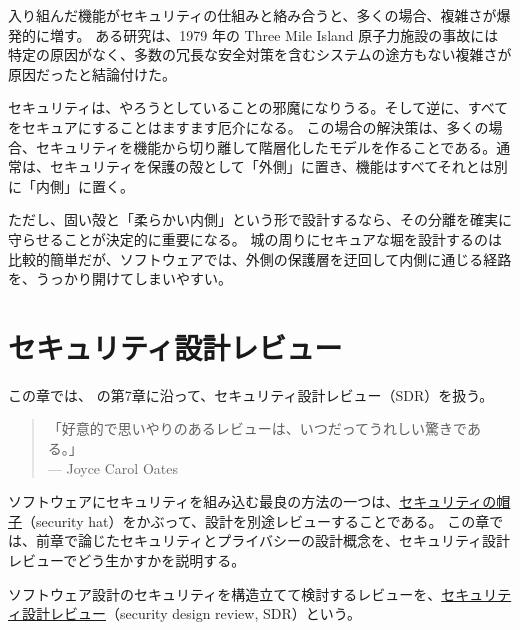 \documentclass[uplatex]{jsarticle}
\def\label#1{}%
\begin{document}
\begin{exa}\label{exa:ch6-three-mile-island}
入り組んだ機能がセキュリティの仕組みと絡み合うと、多くの場合、複雑さが爆発的に増す。
ある研究は、1979 年の Three Mile Island 原子力施設の事故には特定の原因がなく、多数の冗長な安全対策を含むシステムの途方もない複雑さが原因だったと結論付けた。
\end{exa}

セキュリティは、やろうとしていることの邪魔になりうる。そして逆に、すべてをセキュアにすることはますます厄介になる。
この場合の解決策は、多くの場合、セキュリティを機能から切り離して階層化したモデルを作ることである。通常は、セキュリティを保護の殻として「外側」に置き、機能はすべてそれとは別に「内側」に置く。

\begin{rem}[固い殻と柔らかい内側]\label{rem:ch6-hard-shell}
ただし、固い殻と「柔らかい内側」という形で設計するなら、その分離を確実に守らせることが決定的に重要になる。
城の周りにセキュアな堀を設計するのは比較的簡単だが、ソフトウェアでは、外側の保護層を迂回して内側に通じる経路を、うっかり開けてしまいやすい。
\end{rem}

\newpage

\section{セキュリティ設計レビュー}

この章では、\cite{Kohnfelder2021} の第7章に沿って、セキュリティ設計レビュー（SDR）を扱う。

\begin{quote}
「好意的で思いやりのあるレビューは、いつだってうれしい驚きである。」\\
\hfill --- Joyce Carol Oates
\end{quote}

ソフトウェアにセキュリティを組み込む最良の方法の一つは、\underline{セキュリティの帽子}（security hat）をかぶって、設計を別途レビューすることである。
この章では、前章で論じたセキュリティとプライバシーの設計概念を、セキュリティ設計レビューでどう生かすかを説明する。

\begin{dfn}[セキュリティ設計レビュー]\label{dfn:ch7-sdr}
ソフトウェア設計のセキュリティを構造立てて検討するレビューを、\underline{セキュリティ設計レビュー}（security design review, SDR）という。
\end{dfn}
\end{document}
